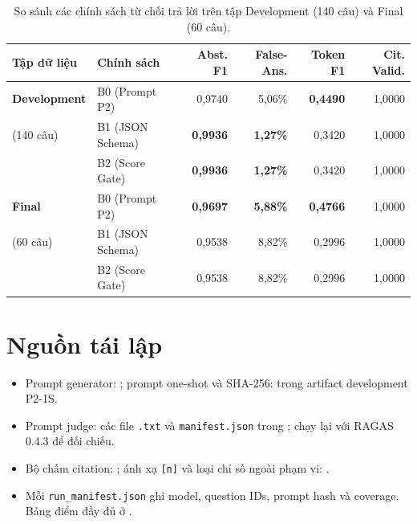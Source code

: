\begin{table}[H]
  \centering
  \caption{So sánh các chính sách từ chối trả lời trên tập Development (140 câu) và Final (60 câu).}
  \label{tab:appendix-phase3}
  \small
  \begin{tabularx}{\textwidth}{@{}llrrrr@{}}
    \toprule
    \textbf{Tập dữ liệu} & \textbf{Chính sách} & \textbf{Abst. F1} & \textbf{False-Ans.} & \textbf{Token F1} & \textbf{Cit. Valid.} \\
    \midrule
    \textbf{Development} & B0 (Prompt P2)   & 0,9740 & 5,06\% & \textbf{0,4490} & 1,0000 \\
    (140 câu)            & B1 (JSON Schema) & \textbf{0,9936} & \textbf{1,27\%} & 0,3420 & 1,0000 \\
                         & B2 (Score Gate)  & \textbf{0,9936} & \textbf{1,27\%} & 0,3420 & 1,0000 \\
    \midrule
    \textbf{Final}       & B0 (Prompt P2)   & \textbf{0,9697} & \textbf{5,88\%} & \textbf{0,4766} & 1,0000 \\
    (60 câu)             & B1 (JSON Schema) & 0,9538 & 8,82\% & 0,2996 & 1,0000 \\
                         & B2 (Score Gate)  & 0,9538 & 8,82\% & 0,2996 & 1,0000 \\
    \bottomrule
  \end{tabularx}
\end{table}

\section{Nguồn tái lập}

\begin{itemize}
  \item Prompt generator: ;
  prompt one-shot và SHA-256:  trong artifact
  development P2-1S.
  \item Prompt judge: các file \texttt{.txt} và \texttt{manifest.json} trong
  ; chạy lại
   với RAGAS 0.4.3 để đối chiếu.
  \item Bộ chấm citation: ; ánh xạ
  \texttt{[n]} và loại chỉ số ngoài phạm vi: .
  \item Mỗi \texttt{run\_manifest.json} ghi model, question IDs, prompt hash và
  coverage. Bảng điểm đầy đủ ở .
\end{itemize}

